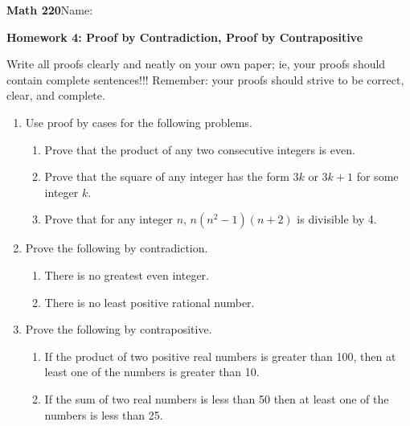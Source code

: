 \documentclass{article}
\begin{document}
{\bf Math 220}\hfill{Name:}

{\bf Homework 4: Proof by Contradiction, Proof by Contrapositive}
\vspace{.3in}

Write all proofs clearly and neatly on your own paper; ie, your proofs should contain complete sentences!!! Remember: your proofs should strive to be correct, clear, and complete.


\begin{enumerate}
\item  Use proof by cases for the following problems.

\begin{enumerate}
\item Prove that the product of any two consecutive integers is even.

\smallskip

\item Prove that the square of any integer has the form $3k$ or $3k+1$ for some integer $k$.

\smallskip

\item Prove that for any integer $n$, $n(n^2-1)(n+2)$ is divisible by 4.

\smallskip

\end{enumerate}

\item Prove the following by contradiction.

\begin{enumerate}
\item There is no greatest even integer.

\smallskip

\item There is no least positive rational number.

\smallskip

\end{enumerate}
\item Prove the following by contrapositive.

\begin{enumerate}
\item If the product of two positive real numbers is greater than 100, then at least one of the numbers is greater than 10.

\smallskip

\item If the sum of two real numbers is less than 50 then at least one of the numbers is less than 25.


\end{enumerate}
\end{enumerate}
\end{document}
